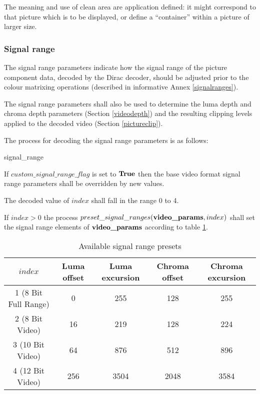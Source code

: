 \begin{informative}
The meaning and use of clean area are application defined: it might correspond
to that picture which is to be displayed, or define a ``container'' within
a picture of larger size.
\end{informative}

\subsubsection{Signal range}
\label{signalrange}

The signal range parameters indicate how the signal range of the picture 
component data, decoded by the Dirac decoder, should be adjusted prior to 
the colour matrixing operations (described in informative Annex \ref{signalranges}). 

The signal range parameters shall also be used to determine the luma depth 
and chroma depth parameters (Section \ref{videodepth}) and the resulting 
clipping levels applied to the decoded video (Section \ref{pictureclip}).

The process for decoding the signal range parameters is as follows:

\begin{pseudo}{signal\_range}{\VideoParams}
    \bsELSE
    \bsEND
\bsEND
\end{pseudo}

If $custom\_signal\_range\_flag$ is set to $\text{\bf{True}}$ then the base video format
signal range parameters shall be overridden by new values.

The decoded value of $index$ shall fall in the range 0 to 4.

If $index>0$ the process $preset\_signal\_ranges(\textbf{video\_params},index)$ 
shall set the signal range elements of $\textbf{video\_params}$ according to table 
\ref{table:signalrangevalues}.

\begin{table}[!ht]
\centering
\begin{tabular}{|c|c|c|c|c|}
\hline
\rowcolor[gray]{0.75}$index$ & Luma offset & Luma excursion & Chroma offset & Chroma excursion\\
\hline
1 (8 Bit Full Range) & 0 & 255 & 128 & 255\\
\hline
2 (8 Bit Video) & 16 & 219 & 128 & 224\\
\hline
3 (10 Bit Video) & 64 & 876 & 512 &  896\\
\hline
4 (12 Bit Video) & 256 & 3504 & 2048 & 3584\\
\hline
\end{tabular}
\caption{Available signal range presets}\label{table:signalrangevalues}
\end{table}

